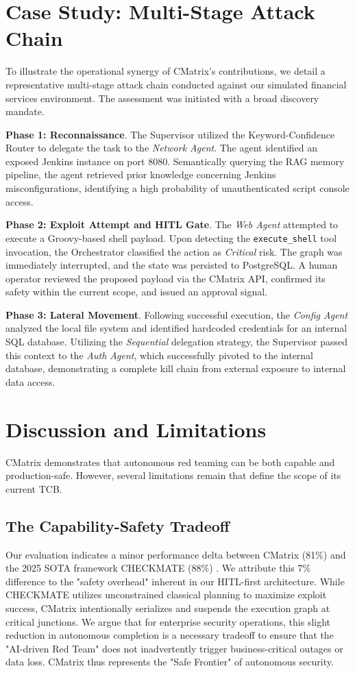 \documentclass[conference,compsoc]{IEEEtran}
\begin{document}
\section{Case Study: Multi-Stage Attack Chain}
To illustrate the operational synergy of CMatrix's contributions, we detail a representative multi-stage attack chain conducted against our simulated financial services environment. The assessment was initiated with a broad discovery mandate.

\textbf{Phase 1: Reconnaissance}. The Supervisor utilized the Keyword-Confidence Router to delegate the task to the \textit{Network Agent}. The agent identified an exposed Jenkins instance on port 8080. Semantically querying the RAG memory pipeline, the agent retrieved prior knowledge concerning Jenkins misconfigurations, identifying a high probability of unauthenticated script console access.

\textbf{Phase 2: Exploit Attempt and HITL Gate}. The \textit{Web Agent} attempted to execute a Groovy-based shell payload. Upon detecting the \texttt{execute\_shell} tool invocation, the Orchestrator classified the action as \textit{Critical} risk. The graph was immediately interrupted, and the state was persisted to PostgreSQL. A human operator reviewed the proposed payload via the CMatrix API, confirmed its safety within the current scope, and issued an approval signal.

\textbf{Phase 3: Lateral Movement}. Following successful execution, the \textit{Config Agent} analyzed the local file system and identified hardcoded credentials for an internal SQL database. Utilizing the \textit{Sequential} delegation strategy, the Supervisor passed this context to the \textit{Auth Agent}, which successfully pivoted to the internal database, demonstrating a complete kill chain from external exposure to internal data access.

\section{Discussion and Limitations} \label{sec:discussion}
CMatrix demonstrates that autonomous red teaming can be both capable and production-safe. However, several limitations remain that define the scope of its current TCB.

\subsection{The Capability-Safety Tradeoff}
Our evaluation indicates a minor performance delta between CMatrix (81\%) and the 2025 SOTA framework CHECKMATE (88\%) \cite{checkmate2025}. We attribute this 7\% difference to the "safety overhead" inherent in our HITL-first architecture. While CHECKMATE utilizes unconstrained classical planning to maximize exploit success, CMatrix intentionally serializes and suspends the execution graph at critical junctions. We argue that for enterprise security operations, this slight reduction in autonomous completion is a necessary tradeoff to ensure that the "AI-driven Red Team" does not inadvertently trigger business-critical outages or data loss. CMatrix thus represents the "Safe Frontier" of autonomous security.
\end{document}
